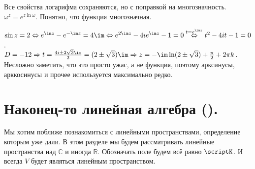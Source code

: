 \documentclass{article}
\begin{document}
\begin{itemize}
        \thm Все свойства логарифма сохраняются, но с поправкой на многозначность.
        \dfn $\omega^z=e^{z\ln\omega}$. Понятно, что функция многозначная.
        \begin{Example}
            $\sin z=2\Leftrightarrow e^{\im z}-e^{-\im z}=4\im\Leftrightarrow e^{2\im z}-4ie^{\im z}-1=0\overset{t=e^{\im z}}\Leftrightarrow t^2-4it-1=0$.\\
            $D=-12\Rightarrow t=\frac{4i\pm2\sqrt3\im}{2}=(2\pm\sqrt3)\im\Rightarrow z=-\im\ln(2\pm\sqrt3)+\frac\pi2+2\pi k$. Несложно заметить, что это просто ужас, а не функция, поэтому арксинусы, арккосинусы и прочее используется максимально редко.
        \end{Example}
    \end{itemize}
    \section{Наконец-то линейная алгебра (\!).}
    \begin{Comment}
        Мы хотим поближе познакомиться с линейными пространствами, определение которым уже дали. В этом разделе мы будем рассматривать линейные пространства над $\mathbb C$ и иногда $\mathbb R$. Обозначать поле будем всё равно $\scriptK$. И всегда $V$ будет являться линейным пространством.
    \end{Comment}
\end{document}
